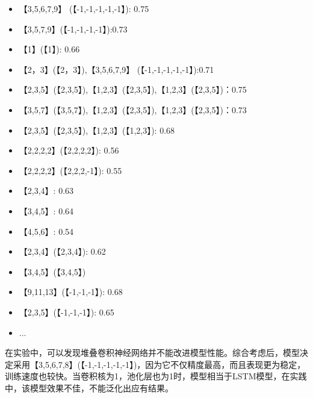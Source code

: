 \begin{itemize}
\item 【3,5,6,7,9】 (【-1,-1,-1,-1,-1】): 0.75
\item 【3,5,7,9】(【-1,-1,-1,-1】):0.73
\item 【1】(【1】): 0.66
\item 【2，3】(【2，3】),【3,5,6,7,9】 (【-1,-1,-1,-1,-1】):0.71
\item 【2,3,5】(【2,3,5】),【1,2,3】(【2,3,5】),【1,2,3】(【2,3,5】)：0.75
\item 【3,5,7】(【3,5,7】),【1,2,3】(【2,3,5】),【1,2,3】(【2,3,5】)：0.73
\item 【2,3,5】(【2,3,5】),【1,2,3】(【1,2,3】): 0.68
\item 【2,2,2,2】(【2,2,2,2】): 0.56
\item 【2,2,2,2】(【2,2,2,-1】): 0.55
\item 【2,3,4】: 0.63
\item 【3,4,5】: 0.64
\item 【4,5,6】: 0.54
\item 【2,3,4】(【2,3,4】): 0.62
\item 【3,4,5】(【3,4,5】)
\item 【9,11,13】(【-1,-1,-1】): 0.68
\item 【2,3,5】(【-1,-1,-1】): 0.65
\item ...
\end{itemize}

在实验中，可以发现堆叠卷积神经网络并不能改进模型性能。综合考虑后，模型决定采用【3,5,6,7,8】(【-1,-1,-1,-1,-1】)，因为它不仅精度最高，而且表现更为稳定，训练速度也较快。当卷积核为1，池化层也为1时，模型相当于LSTM模型，在实践中，该模型效果不佳，不能泛化出应有结果。

